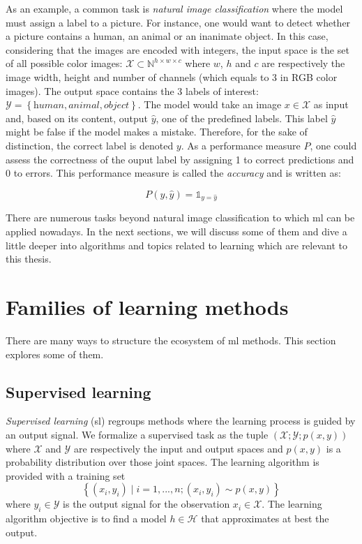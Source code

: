 As an example, a common task is \textit{natural image classification} where the model must assign a label to a picture. For instance, one would want to detect whether a picture contains a human, an animal or an inanimate object. In this case, considering that the images are encoded with integers, the input space is the set of all possible color images: $\mathcal{X} \subset \mathbb{N}^{h\times w\times c}$ where $w$, $h$ and $c$ are respectively the image width, height and number of channels (which equals to 3 in RGB color images). The output space contains the 3 labels of interest: $\mathcal{Y} = \left\{\textit{human}, \textit{animal}, \textit{object}\right\}$. The model would take an image $x \in \mathcal{X}$ as input and, based on its content, output $\hat{y}$, one of the predefined labels. This label $\hat{y}$ might be false if the model makes a mistake. Therefore, for the sake of distinction, the correct label is denoted $y$. As a performance measure $P$, one could assess the correctness of the ouput label by assigning 1 to correct predictions and 0 to errors. This performance measure is called the \textit{accuracy} and is written as: 

\begin{equation}
P(y, \hat{y}) = \mathbb{1}_{y=\hat{y}}
\end{equation}

There are numerous tasks beyond natural image classification to which \acrlong{ml} can be applied nowadays. In the next sections, we will discuss some of them and dive a little deeper into algorithms and topics related to learning which are relevant to this thesis.


\section{Families of learning methods}
\label{sec:backml:families}

There are many ways to structure the ecosystem of \acrlong{ml} methods. This section explores some of them.

\subsection{Supervised learning}
\label{ssec:backml:supvsunsup}

\textit{Supervised learning} (\acrshort{sl}) regroups methods where the learning process is guided by an output signal. We formalize a supervised task as the tuple $\left(\mathcal{X}; \mathcal{Y}; p(x, y)\right)$ where $\mathcal{X}$ and $\mathcal{Y}$ are respectively the input and output spaces and $p(x, y)$ is a probability distribution over those joint spaces. The learning algorithm is provided with a training set 
\begin{equation}
\label{eqn:backml:supervised}
\left\{(x_i, y_i) \mid i = 1,...,n ; (x_i, y_i) \sim p(x, y) \right\}
\end{equation}
where $y_i \in \mathcal{Y}$ is the output signal for the observation $x_i \in \mathcal{X}$. The learning algorithm objective is to find a model $h \in \mathcal{H}$ that approximates at best the output. 

